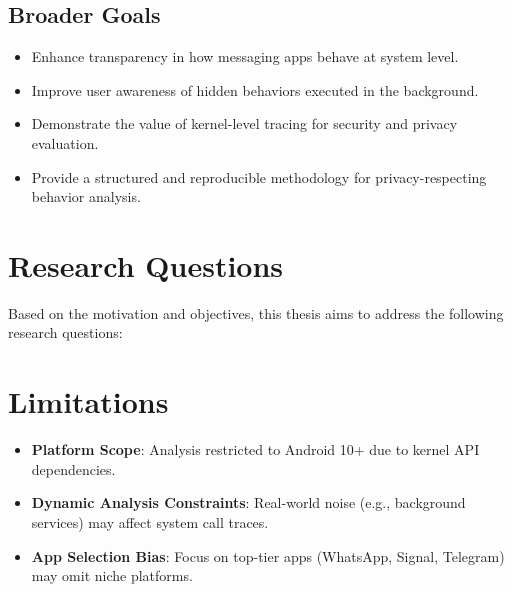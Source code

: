 \documentclass[a4paper,12pt]{report}
\begin{document}
\subsection*{Broader Goals}
\begin{itemize}
\item Enhance transparency in how messaging apps behave at system level.
\item Improve user awareness of hidden behaviors executed in the background.
\item Demonstrate the value of kernel-level tracing for security and privacy evaluation.
\item Provide a structured and reproducible methodology for privacy-respecting behavior analysis.
\end{itemize}

\section{Research Questions}
Based on the motivation and objectives, this thesis aims to address the following research questions:

\vspace{0.5em}
\noindent{}

\vspace{0.5em}
\noindent{}

\vspace{0.5em}
\noindent{}

\vspace{0.5em}
\noindent{}

\vspace{0.5em}
\noindent{}


\section{Limitations}
\begin{itemize}
    \item \textbf{Platform Scope}: Analysis restricted to Android 10+ due to kernel API dependencies.
    \item \textbf{Dynamic Analysis Constraints}: Real-world noise (e.g., background services) may affect system call traces.
    \item \textbf{App Selection Bias}: Focus on top-tier apps (WhatsApp, Signal, Telegram) may omit niche platforms.
\end{itemize}
\end{document}
